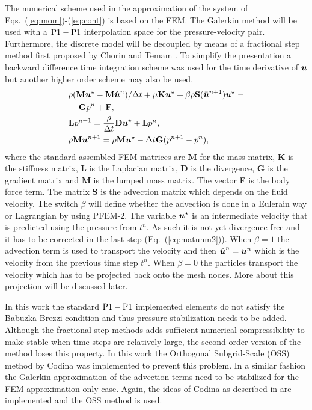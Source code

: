 The numerical scheme used in the approximation of the system of Eqs.~(\ref{eq:mom})-(\ref{eq:cont}) is based on the FEM. The Galerkin method will be used with a $\rm{P1}-\rm{P1}$ interpolation space for the pressure-velocity pair. Furthermore, the discrete model will be decoupled by means of a fractional step method first proposed by Chorin \cite{chorin} and Temam \cite{temam}. To simplify the presentation a backward difference time integration scheme was used for the time derivative of $\boldsymbol{u}$ but another higher order scheme may also be used. 
%
\begin{align}\label{eq:masamat}
&\rho (\textbf{M}\boldsymbol{u}^\star-\textbf{M}\hat{\boldsymbol{u}}^n)/\Delta t+\mu\textbf{K}\boldsymbol{u}^{\star} +\beta\rho\textbf{S}(\bar{\boldsymbol{u}}^{n+1})\boldsymbol{u}^{\star}  = \nonumber\\&-\textbf{G}p^n+ \textbf{F},
\\\label{eq:matpres2}
& \textbf{L}p^{n+1}=\frac{\rho}{\Delta t}\textbf{D}\boldsymbol{u}^\star+ \textbf{L}  p^{n},
\\\label{eq:matunm2}
&\rho \bar{\textbf{M}}\boldsymbol{u}^{n+1}=\rho \bar{\textbf{M}}\boldsymbol{u}^\star-\Delta t\textbf{G}(p^{n+1}- p^n),
\end{align}
%
where the standard assembled FEM matrices are \textbf{M} for the mass matrix, \textbf{K} is the stiffness matrix, \textbf{L} is the Laplacian matrix, \textbf{D} is the divergence, \textbf{G} is the gradient matrix and $\bar{\textbf{M}}$ is the lumped mass matrix. The vector \textbf{F} is the body force term. The matrix \textbf{S} is the advection matrix which depends on the fluid velocity. The switch $\beta$ will define whether the advection is done in a Eulerain way or Lagrangian by using PFEM-2. The variable $\boldsymbol{u}^\star$ is an intermediate velocity that is predicted using the pressure from $t^n$. As such it is not yet divergence free and it has to be corrected in the last step (Eq.~(\ref{eq:matunm2})). When $\beta=1$ the advection term is used to transport the velocity and then  $\hat{\boldsymbol{u}}^n=\boldsymbol{u}^n$ which is the velocity from the previous time step $t^n$. When $\beta=0$ the particles transport the velocity which has to be projected back onto the mesh nodes. More about this projection will be discussed later.

In this work the standard $\rm{P1}-\rm{P1}$ implemented elements do not satisfy the Babuzka-Brezzi condition and thus pressure stabilization needs to be added. Although the fractional step methods adds sufficient numerical compressibility to make stable when time steps are relatively large, the second order version of the method loses this property. In this work the Orthogonal Subgrid-Scale (OSS) method by Codina \cite{codina-oss-press} was implemented to prevent this problem. In a similar fashion the Galerkin approximation of the advection terms need to be stabilized for the FEM approximation only case. Again, the ideas of Codina as described in \cite{codina-soto} are implemented and the OSS method is used. 
